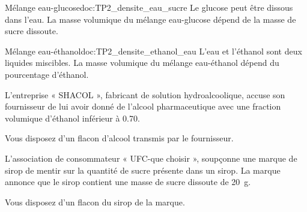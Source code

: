 \begin{multicols}{2}
  \begin{doc}{Mélange eau-glucose}{doc:TP2_densite_eau_sucre}
    Le glucose peut être dissous dans l'eau.
    La masse volumique du mélange eau-glucose dépend de la masse de sucre dissoute.
    \begin{center}
    \end{center}
  \end{doc}  
  
  \begin{doc}{Mélange eau-éthanol}{doc:TP2_densite_ethanol_eau}
    L'eau et l'éthanol sont deux liquides miscibles.
    La masse volumique du mélange eau-éthanol dépend du pourcentage d'éthanol.
    \begin{center}
    \end{center}
  \end{doc}
\end{multicols}


L'entreprise « SHACOL », fabricant de solution hydroalcoolique, accuse son fournisseur de lui avoir donné de l'alcool pharmaceutique avec une fraction volumique d'éthanol inférieur à \num{0,70}.

Vous disposez d'un flacon d'alcool transmis par le fournisseur.

\begin{center}
\end{center}



L'association de consommateur « UFC-que choisir », soupçonne une marque de sirop de mentir sur la quantité de sucre présente dans un sirop.
La marque annonce que le sirop contient une masse de sucre dissoute de \qty{20}{\g}.

Vous disposez d'un flacon du sirop de la marque.

\begin{center}
\end{center}
